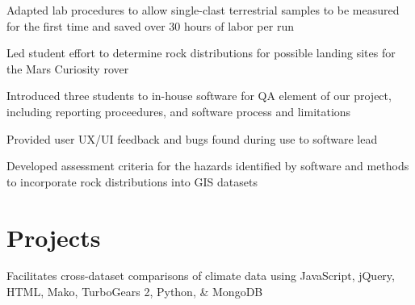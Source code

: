 \documentclass[letterpaper]{deedy-resume} %
\begin{document}
\begin{minipage}[t]{0.66\textwidth}

\begin{tightitemize}
\item Adapted lab procedures to allow single-clast terrestrial samples to be measured for the first time and saved over 30 hours of labor per run \\
\end{tightitemize}

\sectionspace %



\begin{tightitemize}
\item Led student effort to determine rock distributions for possible landing sites for the Mars Curiosity rover \\
\item Introduced three students to in-house software for QA element of our project, including reporting proceedures, and software process and limitations \\
\item Provided user UX/UI feedback and bugs found during use to software lead \\
\item Developed assessment criteria for the hazards identified by software and methods to incorporate rock distributions into GIS datasets \\
\end{tightitemize}

\sectionspace %


\section{Projects} 

Facilitates cross-dataset comparisons of climate data using JavaScript, jQuery, HTML, Mako, TurboGears 2, Python, \& MongoDB \\
\sectionspace %


\end{minipage}
\end{document}

